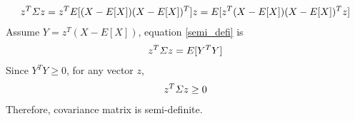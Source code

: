 \documentclass[12pt]{article}
\begin{document}
	\begin{equation}{\label{semi_defi}}
	\begin{aligned}
		z^T\varSigma z =z^TE[(X-E[X])(X-E[X])^T]z=E[z^T(X-E[X])(X-E[X])^Tz]
	\end{aligned}
	\end{equation}
	Assume $Y=z^T(X-E[X])$, equation \ref{semi_defi} is 
	\begin{equation}{\label{semi_defi_var1}}
	\begin{aligned}
		z^T\varSigma z =E[Y^TY]
	\end{aligned}
	\end{equation}
	Since $Y^TY\ge 0$, for any vector $z$,
	\begin{equation}{\label{semi_defi_var2}}
	\begin{aligned}
		z^T\varSigma z \ge 0
	\end{aligned}
	\end{equation}
	Therefore, covariance matrix is semi-definite.


\end{document}
